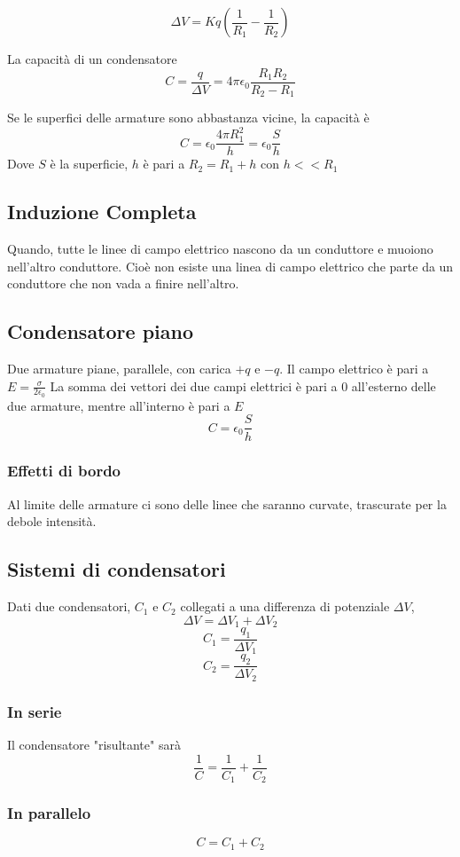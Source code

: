 \documentclass[a4paper]{report}
\begin{document}
  \[ \Delta V = Kq (\frac{1}{R_1} - \frac{1}{R_2}) \]

  La capacità di un condensatore
  \[ C= \frac{q}{\Delta V} = 4 \pi \epsilon_0 \frac{R_1 R_2}{R_2 - R_1} \]

  Se le superfici delle armature sono abbastanza vicine, la capacità è
  \[C = \epsilon_0 \frac{4 \pi R_1^2}{h} = \epsilon_0 \frac{S}{h}\]
  Dove $S$ è la superficie, $h$ è pari a $R_2 = R_1 + h$ con $h<<R_1$

  \subsection{Induzione Completa}
  Quando, tutte le linee di campo elettrico nascono da un conduttore e muoiono nell'altro conduttore. Cioè non esiste una linea di campo elettrico che parte da un conduttore che non vada a finire nell'altro.

  \subsection{Condensatore piano}
  Due armature piane, parallele, con carica $+q$ e $-q$.
  Il campo elettrico è pari a \( E = \frac{\sigma}{2\epsilon_0} \)
  La somma dei vettori dei due campi elettrici è pari a $0$ all'esterno delle due armature, mentre all'interno è pari a $E$
  \[ C = \epsilon_0 \frac{S}{h} \]
  \subsubsection{Effetti di bordo}
  Al limite delle armature ci sono delle linee che saranno curvate, trascurate per la debole intensità.
  \subsection{Sistemi di condensatori}
  Dati due condensatori, $C_1$ e $C_2$ collegati a una differenza di potenziale $\Delta V$,
  \[ \Delta V = \Delta V_1 + \Delta V_2 \]
  \[ C_1 = \frac{q_1}{\Delta V_1} \]
  \[ C_2 = \frac{q_2}{\Delta V_2} \]

  \subsubsection{In serie}
  Il condensatore "risultante" sarà
  \[ \frac{1}{C} = \frac{1}{C_1} + \frac{1}{C_2} \]

  \subsubsection{In parallelo}
  \[ C = C_1 + C_2 \]
\end{document}
